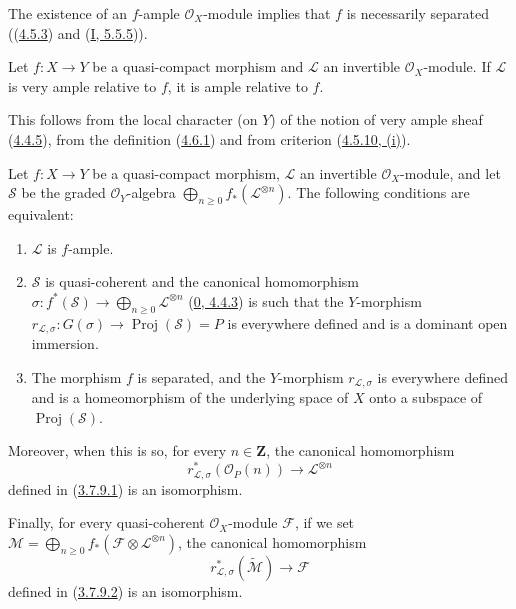 The existence of an $f$-ample $\mathcal{O}_X$-module implies that $f$ is
necessarily separated ((\hyperref[II.4.5.3]{4.5.3}) and
(\hyperref[I.5.5.5]{I, 5.5.5})).

\begin{proposition}[4.6.2]
\label{II.4.6.2}
Let $f:X\to Y$ be a quasi-compact morphism and $\mathcal{L}$ an invertible
$\mathcal{O}_X$-module. If $\mathcal{L}$ is very ample
relative to $f$, it is ample relative to $f$.
\end{proposition}

This follows from the local character (on $Y$) of the notion of very
ample sheaf (\hyperref[II.4.4.5]{4.4.5}), from the definition
(\hyperref[II.4.6.1]{4.6.1}) and from criterion
(\hyperref[II.4.5.10]{4.5.10, (i)}).

\begin{proposition}[4.6.3]
\label{II.4.6.3}
Let $f:X\to Y$ be a quasi-compact morphism, $\mathcal{L}$ an invertible
$\mathcal{O}_X$-module, and let $\mathcal{S}$ be the graded
$\mathcal{O}_Y$-algebra
$\bigoplus_{n\geq0}f_*(\mathcal{L}^{\otimes n})$. The following conditions
are equivalent:
\begin{enumerate}
  \item[\rm{a)}] $\mathcal{L}$ is $f$-ample.
  \item[\rm{b)}] $\mathcal{S}$ is quasi-coherent and the canonical
  homomorphism $\sigma:f^*(\mathcal{S})\to
  \bigoplus_{n\geq0}\mathcal{L}^{\otimes n}$
  (\hyperref[0.4.4.3]{0, 4.4.3}) is such that the $Y$-morphism
  $r_{\mathcal{L},\sigma}:G(\sigma)\to\operatorname{Proj}(\mathcal{S})=P$
  is everywhere defined and is a dominant open immersion.
  \item[\rm{b')}] The morphism $f$ is separated, and the $Y$-morphism
  $r_{\mathcal{L},\sigma}$ is everywhere defined and is a homeomorphism of
  the underlying space of $X$ onto a subspace of
  $\operatorname{Proj}(\mathcal{S})$.
\end{enumerate}
Moreover, when this is so, for every $n\in\mathbf{Z}$,
the canonical homomorphism
\begin{equation}
\label{II.4.6.3.1}
  r_{\mathcal{L},\sigma}^*(\mathcal{O}_P(n))
  \longrightarrow\mathcal{L}^{\otimes n}
\tag{4.6.3.1}
\end{equation}
defined in (\hyperref[II.3.7.9.1]{3.7.9.1}) is an isomorphism.

Finally, for every quasi-coherent $\mathcal{O}_X$-module $\mathcal{F}$, if
we set
$\mathcal{M}=\bigoplus_{n\geq0}f_*(\mathcal{F}\otimes
\mathcal{L}^{\otimes n})$, the canonical homomorphism
\begin{equation}
\label{II.4.6.3.2}
  r_{\mathcal{L},\sigma}^*(\widetilde{\mathcal{M}})
  \longrightarrow\mathcal{F}
\tag{4.6.3.2}
\end{equation}
defined in (\hyperref[II.3.7.9.2]{3.7.9.2}) is an isomorphism.
\end{proposition}

